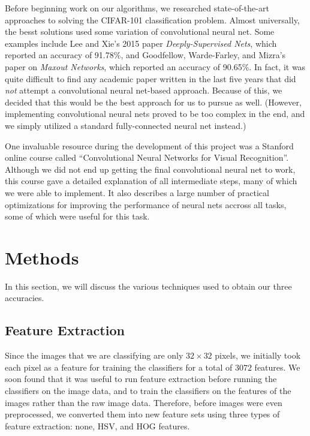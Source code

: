 \documentclass{article} %
\begin{document}
Before beginning work on our algorithms, we researched state-of-the-art approaches to solving the CIFAR-101 classification problem. Almost universally, the besst solutions used some variation of convolutional neural net. Some examples include Lee and Xie's 2015 paper \emph{Deeply-Supervised Nets}, which reported an accuracy of 91.78\%, and Goodfellow, Warde-Farley, and Mizra's paper on \emph{Maxout Networks}, which reported an accuracy of 90.65\%. In fact,  it was quite difficult to find any academic paper written in the last five years that did \emph{not} attempt a convolutional neural net-based approach. Because of this, we decided that this would be the best approach for us to pursue as well. (However, implementing convolutional neural nets proved to be too complex in the end, and we simply utilized a standard fully-connected neural net instead.)

One invaluable resource during the development of this project was a Stanford online course called ``Convolutional Neural Networks for Visual Recognition''. Although we did not end up getting the final convolutional neural net to work, this course gave a detailed explanation of all intermediate steps, many of which we were able to implement. It also describes a large number of practical optimizations for improving the performance of neural nets accross all tasks, some of which were useful for this task.

\section{Methods}

In this section, we will discuss the various techniques used to obtain our three accuracies.

\subsection*{Feature Extraction}

Since the images that we are classifying are only $32 \times 32$ pixels, we initially took each pixel as a feature for training the classifiers for a total of $3072$ features. We soon found that it was useful to run feature extraction before running the classifiers on the image data, and to train the classifiers on the features of the images rather than the raw image data. Therefore, before images were even preprocessed, we converted them into new feature sets using three types of feature extraction: none, HSV, and HOG features.
\end{document}
